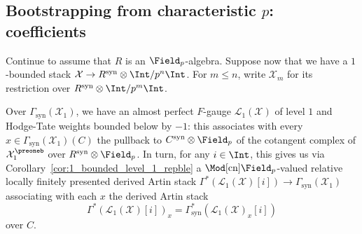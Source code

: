 \documentclass[10pt]{amsart}
\begin{document}
\subsection{Bootstrapping from characteristic $p$: coefficients}
\label{subsec:1-bounded_stacks_bootstrapping_coefficients}

Continue to assume that $R$ is an $\Field_p$-algebra. Suppose now that we have a $1$-bounded stack $\mathcal{X}\to R^{\mathrm{syn}}\otimes\Int/p^n\Int$. For $m\leq n$, write $\mathcal{X}_m$ for its restriction over $R^{\mathrm{syn}}\otimes\Int/p^m\Int$. 

Over $\Gamma_{\mathrm{syn}}(\mathcal{X}_1)$, we have an almost perfect $F$-gauge $\mathcal{L}_1(\mathcal{X})$ of level $1$ and Hodge-Tate weights bounded below by $-1$: this associates with every $x\in \Gamma_{\mathrm{syn}}(\mathcal{X}_1)(C)$ the pullback to $C^{\mathrm{syn}}\otimes\Field_p$ of the cotangent complex of $\mathcal{X}^\preoneb_1$ over $R^{\mathrm{syn}}\otimes\Field_p$. In turn, for any $i\in\Int$, this gives us via Corollary~\ref{cor:1_bounded_level_1_repble} a $\Mod[\mathrm{cn}]{\Field_p}$-valued relative locally finitely presented derived Artin stack $\Gamma^*(\mathcal{L}_1(\mathcal{X})[i])\to \Gamma_{\mathrm{syn}}(\mathcal{X}_1)$ associating with each $x$ the derived Artin stack
\[
\Gamma^*(\mathcal{L}_1(\mathcal{X})[i])_x = \Gamma^*_{\mathrm{syn}}(\mathcal{L}_1(\mathcal{X})_x[i])
\]
over $C$.
\end{document}
